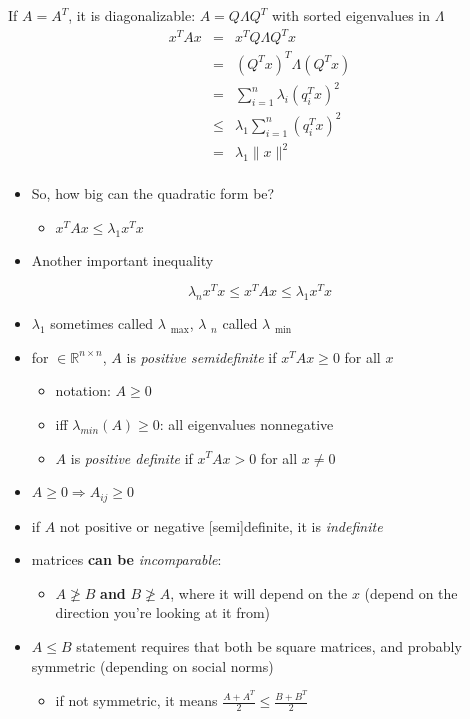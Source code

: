 \documentclass[10pt,letterpaper]{article}
\begin{document}
If $A = A ^{T}$, it is diagonalizable: $A = Q \Lambda Q ^{T}$ with sorted eigenvalues in $\Lambda$
\begin{eqnarray}
  x ^{T} Ax &=& x ^{T} Q \Lambda Q ^{T} x \\
   &=& (Q^Tx) ^{T} \Lambda(Q ^{T}x) \\
   &=& \sum ^{n} _{i=1} \lambda _{i} (q ^{T} _{i} x ) ^{2}  \\
   &\le& \lambda _{1} \sum ^{n} _{i=1} (q _{i} ^{T} x) ^{2}  \\
   &=& \lambda_1 \| x \| ^{2}\\
\end{eqnarray}
\begin{itemize}
\item So, how big can the quadratic form be?

\begin{itemize}
\item $x ^{T} Ax \le \lambda_1 x ^{T} x$
\end{itemize}

\item Another important inequality
\end{itemize}
$$
\lambda_n x ^{T} x \le x ^{T} Ax \le \lambda_1 x ^{T} x
$$
\begin{itemize}
\item $\lambda$$_1$ sometimes called $\lambda$ $_{\mathrm{max}}$, $\lambda$ $_{n}$ called $\lambda$ $_{\mathrm{min}}$
\item for  $\in \mathbb{R}^{n\times n}$, $A$ is \emph{positive semidefinite} if $x ^{T} Ax \ge 0$ for all $x$

\begin{itemize}
\item notation: $A\ge0$
\item iff $\lambda _{min} (A) \ge 0$: all eigenvalues nonnegative
\item $A$ is \emph{positive definite} if $x ^{T} Ax >0$ for all $x\ne 0$
\end{itemize}

\item $A\ge 0 \Rightarrow A _{ij} \ge 0$
\item if $A$ not positive or negative [semi]definite, it is \emph{indefinite}
\item matrices \textbf{can be} \emph{incomparable}:

\begin{itemize}
\item $A \ngeq B$ \textbf{and} $B \ngeq A$, where it will depend on the $x$ (depend on the direction you're looking at it from)
\end{itemize}

\item $A \le B$ statement requires that both be square matrices, and probably symmetric (depending on social norms)

\begin{itemize}
\item if not symmetric, it means $\frac{A+A^T}{2} \le \frac{B+B^T}{2}$
\end{itemize}

\end{itemize}
\end{document}
